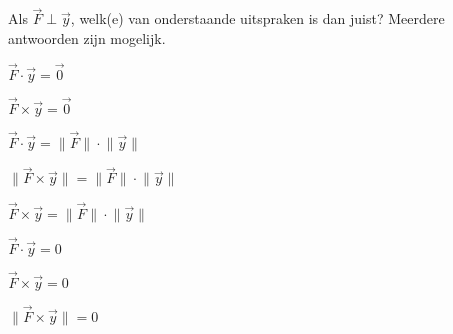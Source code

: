 \documentclass{ximera}
\begin{document}
\begin{exercise}


	
Als \(\vec{F} \; \bot \; \vec{y}\), welk(e) van onderstaande uitspraken is dan juist? 
Meerdere antwoorden zijn mogelijk. 

\begin{question}
\(\vec{F} \cdot \vec{y} = \vec{0}\)
\end{question}

\begin{question}
\(\vec{F} \times \vec{y} = \vec{0}\)
\end{question}

\begin{question}
\(\vec{F} \cdot \vec{y} = \lVert \vec{F} \rVert \cdot \lVert \vec{y} \rVert\)	
\end{question}

\begin{question}
\(\lVert \vec{F} \times \vec{y} \rVert = \lVert \vec{F} \rVert \cdot \lVert \vec{y} \rVert\)	
\end{question}

\begin{question}
\(\vec{F} \times \vec{y} = \lVert \vec{F} \rVert \cdot \lVert \vec{y} \rVert\)	
\end{question}

\begin{question}
\(\vec{F} \cdot \vec{y} = 0\)
\end{question}

\begin{question}
\(\vec{F} \times \vec{y} = 0\)
\end{question}

\begin{question}
\(\lVert \vec{F} \times \vec{y} \rVert = 0\)
\end{question}

\end{exercise}
\end{document}
